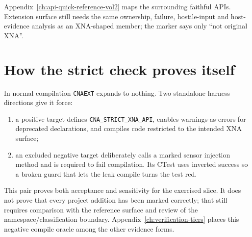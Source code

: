 Appendix~\ref{ch:api-quick-reference-vol2} maps the surrounding faithful APIs.  Extension
surface still needs the same ownership, failure, hostile-input and host-evidence analysis as an
XNA-shaped member; the marker says only ``not original XNA''.

\section{How the strict check proves itself}

In normal compilation \texttt{CNAEXT} expands to nothing.  Two standalone harness directions
give it force:

\begin{enumerate}
  \item a positive target defines \texttt{CNA\_STRICT\_XNA\_API}, enables
        warnings-as-errors for deprecated declarations, and compiles code restricted to the
        intended XNA surface;
  \item an excluded negative target deliberately calls a marked sensor injection method and is
        required to fail compilation.  Its CTest uses inverted success so a broken guard that
        lets the leak compile turns the test red.
\end{enumerate}

This pair proves both acceptance and sensitivity for the exercised slice.  It does not prove
that every project addition has been marked correctly; that still requires comparison with the
reference surface and review of the namespace/classification boundary.  Appendix~\ref{ch:verification-tiers}
places this negative compile oracle among the other evidence forms.
